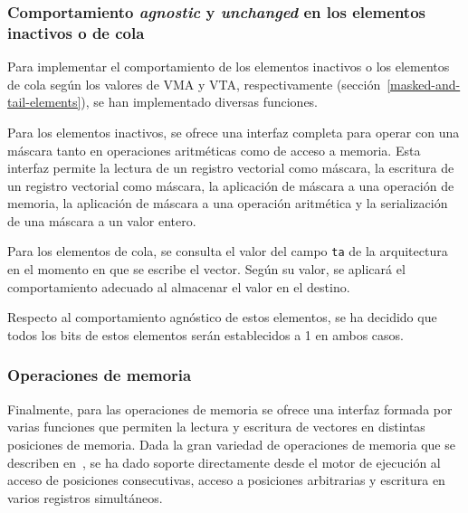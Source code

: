\subsubsection{Comportamiento \textit{agnostic} y \textit{unchanged} en los elementos inactivos o de cola}

Para implementar el comportamiento de los elementos inactivos o los elementos de cola según los valores de VMA y VTA, respectivamente (sección~\ref{masked-and-tail-elements}), se han implementado diversas funciones.

Para los elementos inactivos, se ofrece una interfaz completa para operar con una máscara tanto en operaciones aritméticas como de acceso a memoria. Esta interfaz permite la lectura de un registro vectorial como máscara, la escritura de un registro vectorial como máscara, la aplicación de máscara a una operación de memoria, la aplicación de máscara a una operación aritmética y la serialización de una máscara a un valor entero.

Para los elementos de cola, se consulta el valor del campo \texttt{ta} de la arquitectura en el momento en que se escribe el vector. Según su valor, se aplicará el comportamiento adecuado al almacenar el valor en el destino. 

Respecto al comportamiento agnóstico de estos elementos, se ha decidido que todos los bits de estos elementos serán establecidos a 1 en ambos casos.

\subsubsection{Operaciones de memoria}

Finalmente, para las operaciones de memoria se ofrece una interfaz formada por varias funciones que permiten la lectura y escritura de vectores en distintas posiciones de memoria. Dada la gran variedad de operaciones de memoria que se describen en~\cite{riscv-isa2024}, se ha dado soporte directamente desde el motor de ejecución al acceso de posiciones consecutivas, acceso a posiciones arbitrarias y escritura en varios registros simultáneos.



